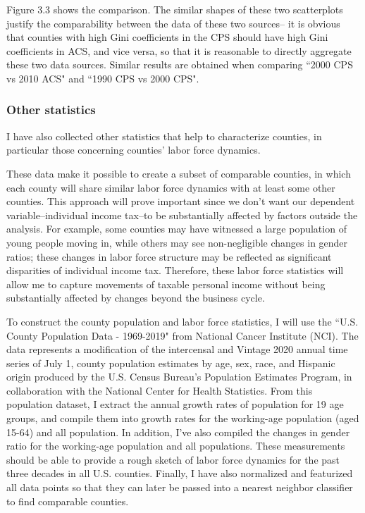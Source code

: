 \documentclass{article}
\begin{document}
Figure 3.3 shows the comparison. The similar shapes of these two scatterplots justify the comparability between the data of these two sources-- it is obvious that counties with high Gini coefficients in the CPS should have high Gini coefficients in ACS, and vice versa, so that it is reasonable to directly aggregate these two data sources. Similar results are obtained when comparing ``2000 CPS vs 2010 ACS" and ``1990 CPS vs 2000 CPS". 

\subsubsection{Other statistics}

I have also collected other statistics that help to characterize counties, in particular those concerning counties' labor force dynamics. 

These data make it possible to create a subset of comparable counties, in which each county will share similar labor force dynamics with at least some other counties. This approach will prove important since we don't want our dependent variable--individual income tax--to be substantially affected by factors outside the analysis. For example, some counties may have witnessed a large population of young people moving in, while others may see non-negligible changes in gender ratios; these changes in labor force structure may be reflected as significant disparities of individual income tax. Therefore, these labor force statistics will allow me to capture movements of taxable personal income without being substantially affected by changes beyond the business cycle. 

To construct the county population and labor force statistics, I will use the ``U.S. County Population Data - 1969-2019" from National Cancer Institute (NCI). The data represents a modification of the intercensal and Vintage 2020 annual time series of July 1, county population estimates by age, sex, race, and Hispanic origin produced by the U.S. Census Bureau's Population Estimates Program, in collaboration with the National Center for Health Statistics. From this population dataset, I extract the annual growth rates of population for 19 age groups, and compile them into growth rates for the working-age population (aged 15-64) and all population. In addition, I've also compiled the changes in gender ratio for the working-age population and all populations. These measurements should be able to provide a rough sketch of labor force dynamics for the past three decades in all U.S. counties. Finally, I have also normalized and featurized all data points so that they can later be passed into a nearest neighbor classifier to find comparable counties. 
\end{document}
